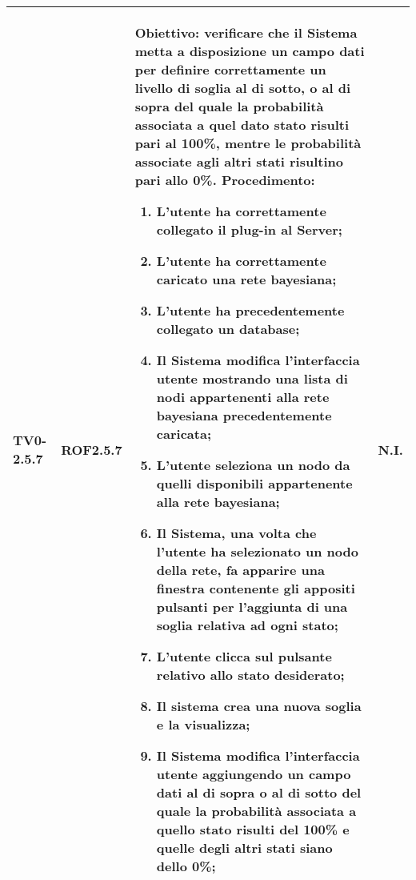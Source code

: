 \begin{longtable}{|C{.15\textwidth}|C{.13\textwidth}|m{.65\textwidth}|C{.08\textwidth}|}
TV0-2.5.7 & ROF2.5.7 &
	\textbf{Obiettivo}: verificare che il Sistema metta a disposizione un campo dati per definire correttamente un livello di soglia al di sotto, o al di sopra del quale la probabilità associata a quel dato stato risulti pari al 100\%, mentre le probabilità associate agli altri stati risultino pari allo 0\%. \newline
	\textbf{Procedimento}:
	\begin{enumerate}
		\item L'utente ha correttamente collegato il plug-in al Server;
		\item L'utente ha correttamente caricato una rete bayesiana;
		\item L'utente ha precedentemente collegato un database;
		\item Il Sistema modifica l'interfaccia utente mostrando una lista di nodi appartenenti alla rete bayesiana precedentemente caricata;
		\item L'utente seleziona un nodo da quelli disponibili appartenente alla rete bayesiana;
		\item Il Sistema, una volta che l'utente ha selezionato un nodo della rete, fa apparire una finestra contenente gli appositi pulsanti per l'aggiunta di una soglia relativa ad ogni stato;
		\item L'utente clicca sul pulsante relativo allo stato desiderato;
		\item Il sistema crea una nuova soglia e la visualizza;
		\item Il Sistema modifica l'interfaccia utente aggiungendo un campo dati al di sopra o al di sotto del quale la probabilità associata a quello stato risulti del 100\% e quelle degli altri stati siano dello 0\%;
	\end{enumerate}
	& N.I. \\
\hline


\end{longtable}
